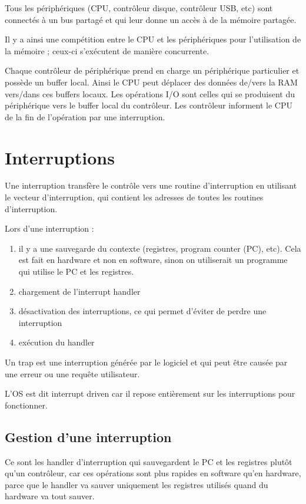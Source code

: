 	Tous les périphériques (CPU, contrôleur disque, contrôleur USB, etc) sont connectés à un bus partagé et qui leur donne un accès à de la mémoire partagée.
	
	Il y a ainsi une compétition entre le CPU et les périphériques pour l'utilisation de la mémoire ; ceux-ci s'exécutent de manière concurrente.
	
	Chaque contrôleur de périphérique prend en charge un périphérique particulier et possède un buffer local. Ainsi le CPU peut déplacer des données de/vers la RAM vers/dans ces buffers locaux. Les opérations I/O sont celles qui se produisent du périphérique vers le buffer local du contrôleur. Les contrôleur informent le CPU de la fin de l'opération par une interruption.
	
	\section{Interruptions}
	
	Une interruption transfère le contrôle vers une routine d'interruption en utilisant le vecteur d'interruption, qui contient les adresses de toutes les routines d'interruption.
	
	Lors d'une interruption :
	
	\begin{enumerate}
		\item il y a une sauvegarde du contexte (registres, program counter (PC), etc). Cela est fait en hardware et non en software, sinon on utiliserait un programme qui utilise le PC et les registres.
		\item chargement de l'interrupt handler
		\item désactivation des interruptions, ce qui permet d'éviter de perdre une interruption
		\item exécution du handler
	\end{enumerate}
	
	Un trap est une interruption générée par le logiciel et qui peut être causée par une erreur ou une requête utilisateur.
	
	L'OS est dit interrupt driven car il repose entièrement sur les interruptions pour fonctionner.
	
		\subsection{Gestion d'une interruption}
		
		Ce sont les handler d'interruption qui sauvegardent le PC et les registres plutôt qu'un contrôleur, car ces opérations sont plus rapides en software qu'en hardware, parce que le handler va sauver uniquement les registres utilisés quand du hardware va tout sauver.
		
